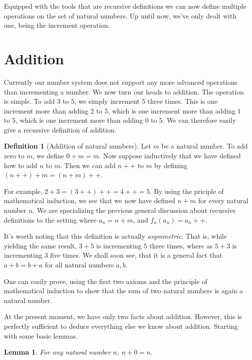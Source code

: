 \documentclass[a4paper, twocolumn]{report}
\newcounter{dummy} \numberwithin{dummy}{section}
\newtheorem{lma}[dummy]{Lemma}
\theoremstyle{definition}
\newtheorem{defn}[dummy]{Definition}
\theoremstyle{solution}
\newcommand{\dplus}{{+}{+}} %
\begin{document}
Equipped with the tools that are recursive definitions we can now define
multiple operations on the set of natural numbers. Up until now, we've only
dealt with one, being the increment operation.

\section{Addition}

Currently our number system does not support any more advanced operations than
incrementing a number.  We now turn our heads to addition. The operation is
simple. To add $3$ to $5$, we simply increment $5$ three times. This is one
increment more than adding $2$ to $5$, which is one increment more than adding
$1$ to $5$, which is one increment more than adding $0$ to $5$. We can
therefore easily give a recursive definition of addition.

\begin{defn}[Addition of natural numbers]
  \label{defn_221}
  Let $m$ be a natural number. To add zero to $m$, we define $0 + m = m$. Now
  suppose inductively that we have defined how to add $n$ to $m$. Then we can
  add $n\dplus$ to $m$ by defining $(n\dplus) + m = (n + m)\dplus$.        
\end{defn}

For example, $2 + 3 = (3\dplus)\dplus = 4\dplus = 5$. By using the priciple of mathematical
induction, we see that we now have defined $n + m$ for every natural number
$n$. We are specializing the previous general discussion about recursive
definitions to the setting where $a_{n} = n + m$, and $f_{n}\left( a_n \right)
= a_{n}\dplus$.

It's worth noting that this definition is actually \textit{asymmetric}. That
is, while yielding the same result, $3 + 5$ is incrementing $5$ three times,
where as $5 + 3$ is incrementing $3$ five times. We shall soon see, that it is
a general fact that $a + b = b + a$ for all natural numbers $a, b$. 

One can easily prove, using the first two axioms and the principle of
mathematical induction to show that the sum of two natural numbers is again a
natural number.

At the present moment, we have only two facts about addition. However, this is
perfectly sufficient to deduce everything else we know about addition. Starting
with some basic lemmas.

\begin{lma}
  \label{lma_222}
  For any natural number $n$, $n + 0 = n$. 
\end{lma}
\end{document}

